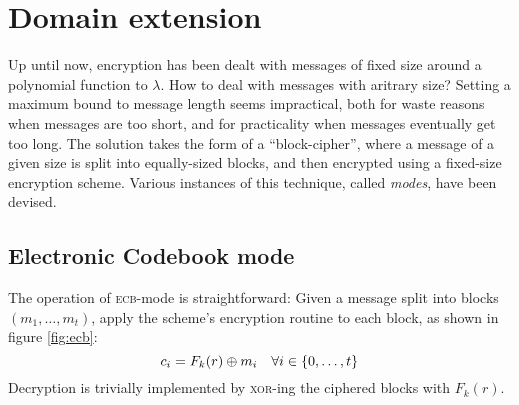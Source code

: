 
\section{Domain extension}

Up until now, encryption has been dealt with messages of fixed size around a polynomial function to $\lambda$. How to deal with messages with aritrary size? Setting a maximum bound to message length seems impractical, both for waste reasons when messages are too short, and for practicality when messages eventually get too long. The solution takes the form of a ``block-cipher'', where a message of a given size is split into equally-sized blocks, and then encrypted using a fixed-size encryption scheme. Various instances of this technique, called \emph{modes}, have been devised.

\subsection{Electronic Codebook mode}

The operation of \textsc{ecb}-mode is straightforward: Given a message split into blocks $(m_1, \dots, m_t)$, apply the scheme's encryption routine to each block, as shown in figure \ref{fig:ecb}:
\[
    c_i = F_k(r) \oplus m_i \quad \forall i \in \{0, \dots, t\}
\]
Decryption is trivially implemented by \textsc{xor}-ing the ciphered blocks with $F_k(r)$.



